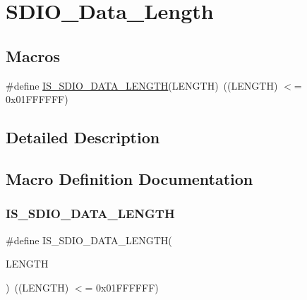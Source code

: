 \hypertarget{group___s_d_i_o___data___length}{}\section{S\+D\+I\+O\+\_\+\+Data\+\_\+\+Length}
\label{group___s_d_i_o___data___length}
\subsection*{Macros}
\begin{DoxyCompactItemize}
\item 
\#define \mbox{\hyperlink{group___s_d_i_o___data___length_ga57dd64db3f69d18625ea8ca82c009fad}{I\+S\+\_\+\+S\+D\+I\+O\+\_\+\+D\+A\+T\+A\+\_\+\+L\+E\+N\+G\+TH}}(L\+E\+N\+G\+TH)~((L\+E\+N\+G\+TH) $<$= 0x01\+F\+F\+F\+F\+F\+F)
\end{DoxyCompactItemize}


\subsection{Detailed Description}


\subsection{Macro Definition Documentation}
\mbox{\label{group___s_d_i_o___data___length_ga57dd64db3f69d18625ea8ca82c009fad}} 
\subsubsection{\texorpdfstring{IS\_SDIO\_DATA\_LENGTH}{IS\_SDIO\_DATA\_LENGTH}}
{\footnotesize\ttfamily \#define I\+S\+\_\+\+S\+D\+I\+O\+\_\+\+D\+A\+T\+A\+\_\+\+L\+E\+N\+G\+TH(\begin{DoxyParamCaption}\item[{}]{L\+E\+N\+G\+TH }\end{DoxyParamCaption})~((L\+E\+N\+G\+TH) $<$= 0x01\+F\+F\+F\+F\+F\+F)}

